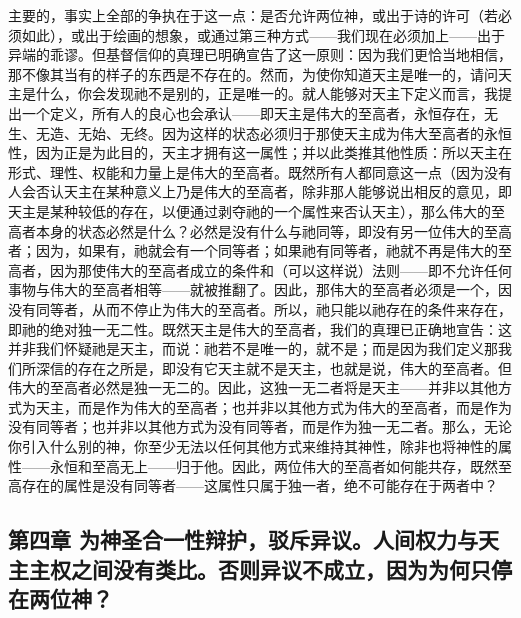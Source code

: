 主要的，事实上全部的争执在于这一点：是否允许两位神，或出于诗的许可（若必须如此），或出于绘画的想象，或通过第三种方式——我们现在必须加上——出于异端的乖谬。但基督信仰的真理已明确宣告了这一原则：因为我们更恰当地相信，那不像其当有的样子的东西是不存在的。然而，为使你知道天主是唯一的，请问天主是什么，你会发现祂不是别的，正是唯一的。就人能够对天主下定义而言，我提出一个定义，所有人的良心也会承认——即天主是伟大的至高者，永恒存在，无生、无造、无始、无终。因为这样的状态必须归于那使天主成为伟大至高者的永恒性，因为正是为此目的，天主才拥有这一属性；并以此类推其他性质：所以天主在形式、理性、权能和力量上是伟大的至高者。既然所有人都同意这一点（因为没有人会否认天主在某种意义上乃是伟大的至高者，除非那人能够说出相反的意见，即天主是某种较低的存在，以便通过剥夺祂的一个属性来否认天主），那么伟大的至高者本身的状态必然是什么？必然是没有什么与祂同等，即没有另一位伟大的至高者；因为，如果有，祂就会有一个同等者；如果祂有同等者，祂就不再是伟大的至高者，因为那使伟大的至高者成立的条件和（可以这样说）法则——即不允许任何事物与伟大的至高者相等——就被推翻了。因此，那伟大的至高者必须是一个，因没有同等者，从而不停止为伟大的至高者。所以，祂只能以祂存在的条件来存在，即祂的绝对独一无二性。既然天主是伟大的至高者，我们的真理已正确地宣告：这并非我们怀疑祂是天主，而说：祂若不是唯一的，就不是；而是因为我们定义那我们所深信的存在之所是，即没有它天主就不是天主，也就是说，伟大的至高者。但伟大的至高者必然是独一无二的。因此，这独一无二者将是天主——并非以其他方式为天主，而是作为伟大的至高者；也并非以其他方式为伟大的至高者，而是作为没有同等者；也并非以其他方式为没有同等者，而是作为独一无二者。那么，无论你引入什么别的神，你至少无法以任何其他方式来维持其神性，除非也将神性的属性——永恒和至高无上——归于他。因此，两位伟大的至高者如何能共存，既然至高存在的属性是没有同等者——这属性只属于独一者，绝不可能存在于两者中？\par


\subsection{第四章 为神圣合一性辩护，驳斥异议。人间权力与天主主权之间没有类比。否则异议不成立，因为为何只停在两位神？}

